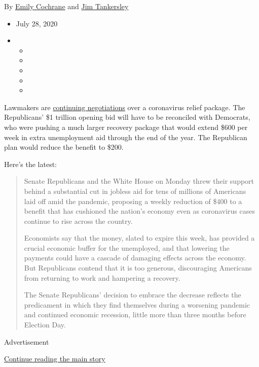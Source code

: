 By \href{https://www.nytimes3xbfgragh.onion/by/emily-cochrane}{Emily
Cochrane} and
\href{https://www.nytimes3xbfgragh.onion/by/jim-tankersley}{Jim
Tankersley}

\begin{itemize}
\item
  July 28, 2020
\item
  \begin{itemize}
  \item
  \item
  \item
  \item
  \item
  \end{itemize}
\end{itemize}

Lawmakers are
\href{https://www.nytimes3xbfgragh.onion/2020/07/27/us/politics/republicans-jobless-aid.html}{continuing
negotiations} over a coronavirus relief package. The Republicans' \$1
trillion opening bid will have to be reconciled with Democrats, who were
pushing a much larger recovery package that would extend \$600 per week
in extra unemployment aid through the end of the year. The Republican
plan would reduce the benefit to \$200.

Here's the latest:

\begin{quote}
Senate Republicans and the White House on Monday threw their support
behind a substantial cut in jobless aid for tens of millions of
Americans laid off amid the pandemic, proposing a weekly reduction of
\$400 to a benefit that has cushioned the nation's economy even as
coronavirus cases continue to rise across the country.

Economists say that the money, slated to expire this week, has provided
a crucial economic buffer for the unemployed, and that lowering the
payments could have a cascade of damaging effects across the economy.
But Republicans contend that it is too generous, discouraging Americans
from returning to work and hampering a recovery.

The Senate Republicans' decision to embrace the decrease reflects the
predicament in which they find themselves during a worsening pandemic
and continued economic recession, little more than three months before
Election Day.
\end{quote}

Advertisement

\protect\hyperlink{after-bottom}{Continue reading the main story}

